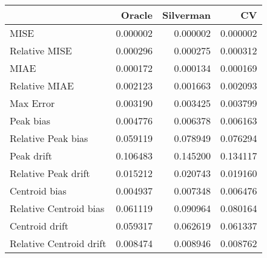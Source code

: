 \begin{tabular}{lrrr}
  \hline
 & Oracle & Silverman & CV \\ 
  \hline
MISE & 0.000002 & 0.000002 & 0.000002 \\ 
  Relative MISE & 0.000296 & 0.000275 & 0.000312 \\ 
  MIAE & 0.000172 & 0.000134 & 0.000169 \\ 
  Relative MIAE & 0.002123 & 0.001663 & 0.002093 \\ 
  Max Error & 0.003190 & 0.003425 & 0.003799 \\ 
  Peak bias & 0.004776 & 0.006378 & 0.006163 \\ 
  Relative Peak bias & 0.059119 & 0.078949 & 0.076294 \\ 
  Peak drift & 0.106483 & 0.145200 & 0.134117 \\ 
  Relative Peak drift & 0.015212 & 0.020743 & 0.019160 \\ 
  Centroid bias & 0.004937 & 0.007348 & 0.006476 \\ 
  Relative Centroid bias & 0.061119 & 0.090964 & 0.080164 \\ 
  Centroid drift & 0.059317 & 0.062619 & 0.061337 \\ 
  Relative Centroid drift & 0.008474 & 0.008946 & 0.008762 \\ 
   \hline
\end{tabular}
